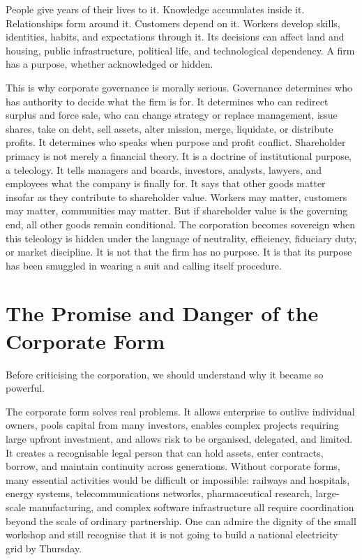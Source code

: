 \documentclass[11pt,a4paper,oneside]{book}
\begin{document}
People give years of their lives to it. Knowledge accumulates inside it. Relationships form around it. Customers depend on it. Workers develop skills, identities, habits, and expectations through it. Its decisions can affect land and housing, public infrastructure, political life, and technological dependency. A firm has a purpose, whether acknowledged or hidden.

This is why corporate governance is morally serious. Governance determines who has authority to decide what the firm is for. It determines who can redirect surplus and force sale, who can change strategy or replace management, issue shares, take on debt, sell assets, alter mission, merge, liquidate, or distribute profits. It determines who speaks when purpose and profit conflict. Shareholder primacy is not merely a financial theory. It is a doctrine of institutional purpose, a teleology. It tells managers and boards, investors, analysts, lawyers, and employees what the company is finally for. It says that other goods matter insofar as they contribute to shareholder value. Workers may matter, customers may matter, communities may matter. But if shareholder value is the governing end, all other goods remain conditional. The corporation becomes sovereign when this teleology is hidden under the language of neutrality, efficiency, fiduciary duty, or market discipline. It is not that the firm has no purpose. It is that its purpose has been smuggled in wearing a suit and calling itself procedure.

\section*{The Promise and Danger of the Corporate Form}

Before criticising the corporation, we should understand why it became so powerful.

The corporate form solves real problems. It allows enterprise to outlive individual owners, pools capital from many investors, enables complex projects requiring large upfront investment, and allows risk to be organised, delegated, and limited. It creates a recognisable legal person that can hold assets, enter contracts, borrow, and maintain continuity across generations. Without corporate forms, many essential activities would be difficult or impossible: railways and hospitals, energy systems, telecommunications networks, pharmaceutical research, large-scale manufacturing, and complex software infrastructure all require coordination beyond the scale of ordinary partnership. One can admire the dignity of the small workshop and still recognise that it is not going to build a national electricity grid by Thursday.
\end{document}
